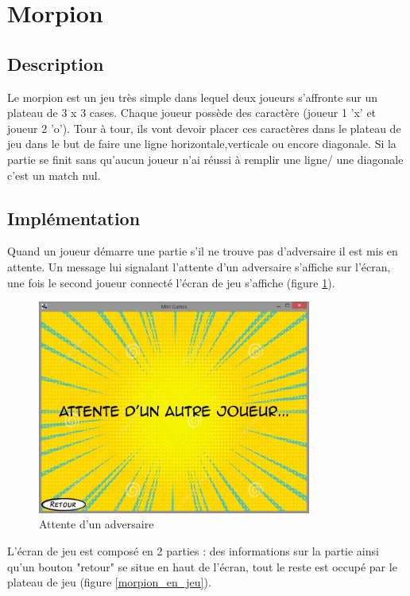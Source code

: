 \documentclass{report}
\begin{document}
\section{Morpion}
\label{Morpion}

\subsection{Description}
Le morpion est un jeu très simple dans lequel deux joueurs s'affronte sur un plateau de 3 x 3 cases. Chaque joueur possède des caractère (joueur 1 'x' et joueur 2 'o').
Tour à tour, ils vont devoir placer ces caractères dans le plateau de jeu dans le but de faire une ligne horizontale,verticale ou encore diagonale.
Si la partie se finit sans qu'aucun joueur n'ai réussi à remplir une ligne/ une diagonale c'est un match nul.
\subsection{Implémentation}

Quand un joueur démarre une partie s'il ne trouve pas d'adversaire il est mis en attente. Un message lui signalant l'attente d'un
adversaire s'affiche sur l'écran, une fois le second joueur connecté l'écran de jeu s'affiche (figure \ref{attente_adversaire}).

\begin{figure}[H]
	\centering\includegraphics[width=9cm]{morpionwaiting}
	\caption{Attente d'un adversaire}
  \label{attente_adversaire}
\end{figure}

L'écran de jeu est composé en 2 parties : des informations sur la partie ainsi qu'un bouton "retour" se situe en haut
de l'écran, tout le reste est occupé par le plateau de jeu (figure \ref{morpion_en_jeu}).
\end{document}
